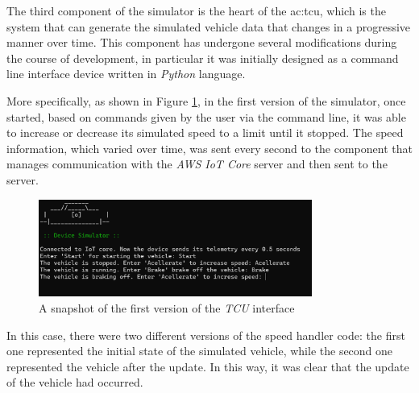 The third component of the simulator is the heart of the \gls{ac:tcu}, which is the system that can generate the simulated vehicle data that changes in a progressive manner over time. This component has undergone several modifications during the course of development, in particular it was initially designed as a command line interface device written in \textit{Python} language.

More specifically, as shown in Figure \ref{fig:telemetryV1}, in the first version of the simulator, once started, based on commands given by the user via the command line, it was able to increase or decrease its simulated speed to a limit until it stopped. The speed information, which varied over time, was sent every second to the component that manages communication with the \textit{AWS IoT Core} server and then sent to the server.

\begin{figure}[h]  %
    \centering
    \includegraphics[width=0.8\textwidth]{images/telemetryV1.png}  %
    \caption{A snapshot of the first version of the \textit{TCU} interface}
    \label{fig:telemetryV1}
\end{figure} 

In this case, there were two different versions of the speed handler code: the first one represented the initial state of the simulated vehicle, while the second one represented the vehicle after the update. In this way, it was clear that the update of the vehicle had occurred.

